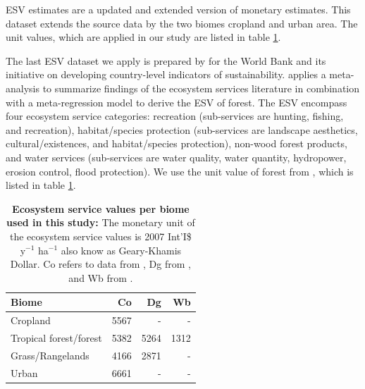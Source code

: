 		\citet{Costanza2014} \ac{ESV} estimates are a updated and extended version of \citet{Groot2012} monetary estimates. This dataset extends the source data by the two biomes cropland and urban area. The unit values, which are applied in our study are listed in table \ref{tab:esv_factors}.

		The last \ac{ESV} dataset we apply is prepared by \citet{Siikamaki2015} for the World Bank and its initiative on developing country-level indicators of sustainability. \citeauthor{Siikamaki2015} applies a meta-analysis to summarize findings of the ecosystem services literature in combination with a meta-regression model to derive the \ac{ESV} of forest. The \ac{ESV} encompass four ecosystem service categories: recreation (sub-services are hunting, fishing, and recreation), habitat/species protection (sub-services are landscape aesthetics, cultural/existences, and habitat/species protection), non-wood forest products, and water services (sub-services are water quality, water quantity, hydropower, erosion control, flood protection). We use the unit value of forest from \citeauthor{Siikamaki2015}, which is listed in table \ref{tab:esv_factors}.
		\begin{table}[ht]
			\centering
			\caption[Ecosystem service values used in this study]{\textbf{Ecosystem service values per biome used in this study:} The monetary unit of the ecosystem service values is 2007 Int'I\$ y$^{-1}$ ha$^{-1}$ also know as Geary-Khamis Dollar. Co refers to data from \citet{Costanza2014}, Dg from \citet{Groot2012}, and Wb from \citet{Siikamaki2015}.}
			\label{tab:esv_factors}
			\begin{tabular}{lrrr}
				\hline
				Biome & Co & Dg & Wb \\\hline
				Cropland & 5567 & - & -\\
				Tropical forest/forest & 5382 & 5264 & 1312\\
				Grass/Rangelands & 4166 & 2871 & -\\
				Urban & 6661 & - & -\\\hline
			\end{tabular}
		\end{table}

